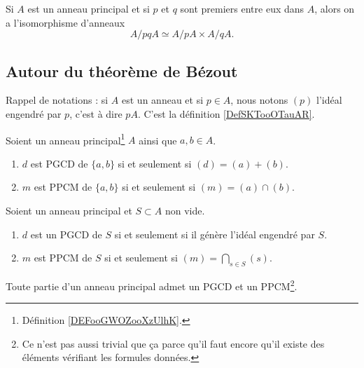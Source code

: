 \begin{theorem}        \label{ThofPXwiM}
	Si \( A\) est un anneau principal et si \( p\) et \( q\) sont premiers entre eux dans \( A\), alors on a l'isomorphisme d'anneaux
	\begin{equation}
		A/pqA\simeq A/pA\times A/qA.
	\end{equation}
\end{theorem}

\subsection{Autour du théorème de Bézout}

Rappel de notations : si \( A\) est un anneau et si \( p\in A\), nous notons \( (p)\) l'idéal engendré par \( p\), c'est à dire \( pA\). C'est la définition \ref{DefSKTooOTauAR}.

\begin{lemma}         \label{LEMooARNUooXqrJGa}
	Soient un anneau principal\footnote{Définition \ref{DEFooGWOZooXzUlhK}.} \( A\) ainsi que \( a,b\in A\).
	\begin{enumerate}
		\item
		      \( d\) est PGCD de \( \{ a,b \}\) si et seulement si \( (d)=(a)+(b)\).
		\item
		      \( m\) est PPCM de \( \{ a,b \}\) si et seulement si \( (m)=(a)\cap (b)\).
	\end{enumerate}
\end{lemma}

\begin{theorem}
	Soient un anneau principal et \( S\subset A\) non vide.
	\begin{enumerate}
		\item
		      \( d\) est un PGCD de \( S\) si et seulement si il génère l'idéal engendré par \( S\).
		\item
		      \( m\) est PPCM de \( S\) si et seulement si \( (m)=\bigcap_{s\in S}(s)\).
	\end{enumerate}
	Toute partie d'un anneau principal admet un PGCD et un PPCM\footnote{ Ce n'est pas aussi trivial que ça parce qu'il faut encore qu'il existe des éléments vérifiant les formules données.}.
\end{theorem}

